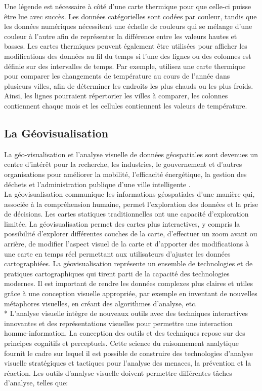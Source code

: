 \documentclass[french, a4paper, 12pt]{report}
\begin{document}
Une légende est nécessaire à côté d’une carte thermique pour que celle-ci puisse être lue avec succès. Les données catégorielles sont codées par couleur, tandis que les données numériques nécessitent une échelle de couleurs qui se mélange d'une couleur à l'autre afin de représenter la différence entre les valeurs hautes et basses. 
Les cartes thermiques peuvent également être utilisées pour afficher les modifications des données au fil du temps si l'une des lignes ou des colonnes est définie sur des intervalles de temps. Par exemple, utilisez une carte thermique pour comparer les changements de température au cours de l’année dans plusieurs villes, afin de déterminer les endroits les plus chauds ou les plus froids. Ainsi, les lignes pourraient répertorier les villes à comparer, les colonnes contiennent chaque mois et les cellules contiennent les valeurs de température.
\subsection{La Géovisualisation}
La géo-visualisation et l'analyse visuelle de données géospatiales sont devenues un centre d'intérêt pour la recherche, les industries, le gouvernement et d'autres organisations pour améliorer la mobilité, l'efficacité énergétique, la gestion des déchets et l'administration publique d'une ville intelligente \cite{12}.\\

La géovisualisation communique les informations géospatiales d'une manière qui, associée à la compréhension humaine, permet l'exploration des données et la prise de décisions. Les cartes statiques traditionnelles ont une capacité d'exploration limitée. La géovisualisation permet des cartes plus interactives, y compris la possibilité d'explorer différentes couches de la carte, d'effectuer un zoom avant ou arrière, de modifier l'aspect visuel de la carte et d’apporter des modifications à une carte en temps réel permettant aux utilisateurs d’ajuster les données cartographiées. La géovisualisation représente un ensemble de technologies et de pratiques cartographiques qui tirent parti de la capacité des technologies modernes. Il est important de rendre les données complexes plus claires et utiles grâce à une conception visuelle appropriée, par exemple en inventant de nouvelles métaphores visuelles, en créant des algorithmes d'analyse, etc. \\*
L'analyse visuelle intègre de nouveaux outils avec des techniques interactives innovantes et des représentations visuelles pour permettre une interaction homme-information. La conception des outils et des techniques repose sur des principes cognitifs et perceptuels. Cette science du raisonnement analytique fournit le cadre sur lequel il est possible de construire des technologies d'analyse visuelle stratégiques et tactiques pour l'analyse des menaces, la prévention et la réaction.
Les outils d'analyse visuelle doivent permettre différentes tâches d'analyse, telles que:
\end{document}
